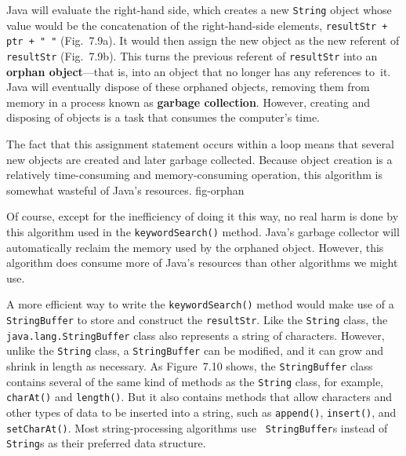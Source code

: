 \noindent Java will evaluate the right-hand side, which creates a new
{\tt String} object whose value would be the concatenation of the
right-hand-side elements, \verb|resultStr + ptr + " "|
(Fig.~7\mbox{.}9a). It would then assign the new object as the new
referent of {\tt resultStr} (Fig.~7.9b).  This turns the previous
referent of {\tt resultStr} into an {\bf orphan object}---that is,
into an object that no longer has any references to~it.  Java will
eventually dispose of these orphaned objects, removing them from
memory in a process known as {\bf garbage collection}.  However,
creating and disposing of objects is a task that consumes the
computer's time.

The fact that this assignment statement occurs within a loop means
that several new objects are created and later garbage collected.
Because object creation is a relatively time-consuming and
memory-consuming operation, this algorithm is somewhat wasteful of
Java's resources.  
{fig-orphan}

Of course, except for the inefficiency of doing it this way, no real
harm is done by this algorithm used in the {\tt keywordSearch()}
method.  Java's garbage collector will automatically reclaim the
memory used by the orphaned object. However, this algorithm does
consume more of Java's resources than other algorithms we might use.


\noindent A more efficient way to write the {\tt keywordSearch()}
method would make use of a {\tt StringBuffer} to store and construct
the {\tt resultStr}.  Like the {\tt String} class, the {\tt
java.lang.StringBuffer} class also represents a string of characters.
However, unlike the {\tt String} class, a {\tt StringBuffer} can be
modified, and it can grow and shrink in length as
necessary.  As Figure~7.10 shows, the {\tt StringBuffer}
class contains several of the same kind of methods as the {\tt String}
class, for example, {\tt charAt()} and {\tt length()}. But it also
contains methods that allow characters and other types of data to be
inserted into a string, such as {\tt append()}, {\tt insert()}, and
{\tt setCharAt()}.  Most string-processing algorithms use {\tt
StringBuffer}s instead of {\tt String}s as their preferred data
structure.

